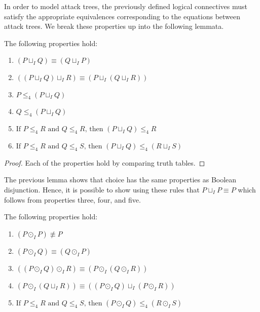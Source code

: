\documentclass{llncs}
\begin{document}
In order to model attack trees, the previously defined logical
connectives must satisfy the appropriate equivalences corresponding to
the equations between attack trees.  We break these properties up into
the following lemmata.

\begin{lemma}
  \label{lemma:basic_properties_for_choice}
  The following properties hold:
  \begin{enumerate}
  \item $(P \sqcup_I Q) \equiv (Q \sqcup_I P)$\\[-5px]
  \item $((P \sqcup_I Q) \sqcup_I R) \equiv (P \sqcup_I (Q \sqcup_I R))$\\[-5px]
  \item $P \leq_4 (P \sqcup_I Q)$\\[-5px]
  \item $Q \leq_4 (P \sqcup_I Q)$\\[-5px]
  \item $\text{If }P \leq_4 R \text{ and } Q \leq_4 R \text{, then } (P \sqcup_I Q) \leq_4 R$\\[-5px]
  \item $\text{If }P \leq_4 R \text{ and } Q \leq_4 S \text{, then } (P \sqcup_I Q) \leq_4 (R \sqcup_I S)$
  \end{enumerate}
\end{lemma}
\begin{proof}
  Each of the properties hold by comparing truth tables.
\end{proof}
The previous lemma shows that choice has the same properties as
Boolean disjunction.  Hence, it is possible to show using these rules
that $P \sqcup_I P \equiv P$ which follows from properties three,
four, and five.
\begin{lemma}
  \label{lemma:basic_properties_for_parallel}
  The following properties hold:
  \begin{enumerate}
  \item $(P \odot_I P) \not\equiv P$\\[-5px]
  \item $(P \odot_I Q) \equiv (Q \odot_I P)$\\[-5px]
  \item $((P \odot_I Q) \odot_I R) \equiv (P \odot_I (Q \odot_I R))$\\[-5px]
  \item $(P \odot_I (Q \sqcup_I R)) \equiv ((P \odot_I Q) \sqcup_I (P \odot_I R))$\\[-5px]
  \item $\text{If }P \leq_4 R \text{ and } Q \leq_4 S \text{, then } (P \odot_I Q) \leq_4 (R \odot_I S)$
  \end{enumerate}
\end{lemma}
\end{document}
